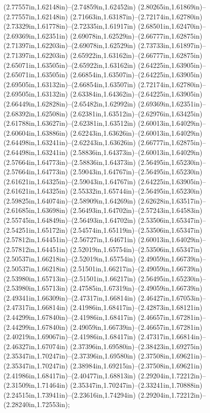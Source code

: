 (2.77557in,1.62148in)--(2.74859in,1.62452in) (2.80265in,1.61869in)--(2.77557in,1.62148in) (2.71663in,1.63187in)--(2.72174in,1.62780in) (2.73329in,1.61778in)--(2.72335in,1.61917in) (2.68501in,1.62470in)--(2.69369in,1.62351in) (2.69078in,1.62529in)--(2.66777in,1.62875in) (2.71397in,1.62203in)--(2.69078in,1.62529in) (2.73733in,1.61897in)--(2.71397in,1.62203in) (2.65922in,1.63162in)--(2.66777in,1.62875in) (2.65071in,1.63505in)--(2.65922in,1.63162in) (2.64225in,1.63905in)--(2.65071in,1.63505in) (2.66854in,1.63507in)--(2.64225in,1.63905in) (2.69505in,1.63132in)--(2.66854in,1.63507in) (2.72174in,1.62780in)--(2.69505in,1.63132in) (2.63384in,1.64362in)--(2.64225in,1.63905in) (2.66449in,1.62828in)--(2.65482in,1.62992in) (2.69369in,1.62351in)--(2.68392in,1.62508in) (2.62381in,1.63512in)--(2.62976in,1.63425in) (2.61788in,1.63627in)--(2.62381in,1.63512in) (2.60013in,1.64029in)--(2.60604in,1.63886in) (2.62243in,1.63626in)--(2.60013in,1.64029in) (2.64498in,1.63241in)--(2.62243in,1.63626in) (2.66777in,1.62875in)--(2.64498in,1.63241in) (2.58836in,1.64373in)--(2.60013in,1.64029in) (2.57664in,1.64773in)--(2.58836in,1.64373in) (2.56495in,1.65230in)--(2.57664in,1.64773in) (2.59043in,1.64767in)--(2.56495in,1.65230in) (2.61621in,1.64325in)--(2.59043in,1.64767in) (2.64225in,1.63905in)--(2.61621in,1.64325in) (2.55332in,1.65744in)--(2.56495in,1.65230in) (2.59825in,1.64074in)--(2.58909in,1.64269in) (2.62628in,1.63517in)--(2.61685in,1.63698in) (2.56493in,1.64702in)--(2.57243in,1.64583in) (2.55745in,1.64849in)--(2.56493in,1.64702in) (2.53506in,1.65347in)--(2.54251in,1.65172in) (2.54574in,1.65119in)--(2.53506in,1.65347in) (2.57812in,1.64451in)--(2.56727in,1.64671in) (2.60013in,1.64029in)--(2.57812in,1.64451in) (2.52019in,1.65754in)--(2.53506in,1.65347in) (2.50537in,1.66218in)--(2.52019in,1.65754in) (2.49059in,1.66739in)--(2.50537in,1.66218in) (2.51501in,1.66217in)--(2.49059in,1.66739in) (2.53980in,1.65713in)--(2.51501in,1.66217in) (2.56495in,1.65230in)--(2.53980in,1.65713in) (2.47585in,1.67319in)--(2.49059in,1.66739in) (2.49341in,1.66309in)--(2.47317in,1.66814in) (2.46427in,1.67053in)--(2.47317in,1.66814in) (2.41986in,1.68417in)--(2.42873in,1.68121in) (2.44299in,1.67840in)--(2.41986in,1.68417in) (2.46657in,1.67281in)--(2.44299in,1.67840in) (2.49059in,1.66739in)--(2.46657in,1.67281in) (2.40219in,1.69067in)--(2.41986in,1.68417in) (2.47317in,1.66814in)--(2.46327in,1.67074in) (2.37396in,1.69580in)--(2.38423in,1.69275in) (2.35347in,1.70247in)--(2.37396in,1.69580in) (2.37508in,1.69621in)--(2.35347in,1.70247in) (2.38984in,1.69215in)--(2.37508in,1.69621in) (2.41986in,1.68417in)--(2.40477in,1.68813in) (2.29204in,1.72212in)--(2.31509in,1.71464in) (2.35347in,1.70247in)--(2.33241in,1.70888in) (2.24515in,1.73941in)--(2.23616in,1.74294in) (2.29204in,1.72212in)--(2.28240in,1.72553in);
